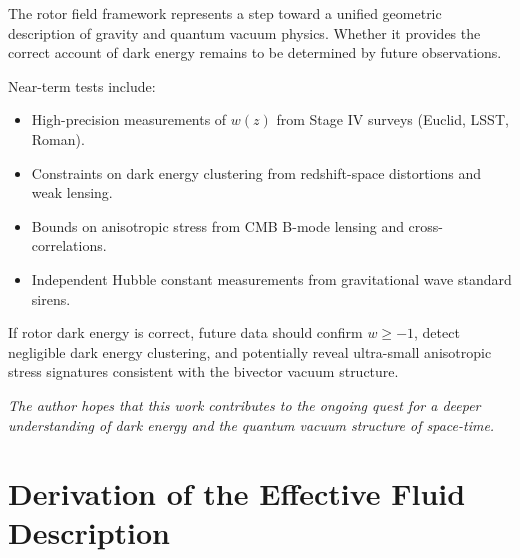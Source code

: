 \documentclass[11pt,a4paper]{article}
\numberwithin{equation}{section}
\theoremstyle{plain}
\theoremstyle{definition}
\theoremstyle{remark}
\newif\ifack
\begin{document}
The rotor field framework represents a step toward a unified geometric description of gravity and quantum vacuum physics. Whether it provides the correct account of dark energy remains to be determined by future observations.

Near-term tests include:
\begin{itemize}
  \item High-precision measurements of $w(z)$ from Stage IV surveys (Euclid, LSST, Roman).
  \item Constraints on dark energy clustering from redshift-space distortions and weak lensing.
  \item Bounds on anisotropic stress from CMB B-mode lensing and cross-correlations.
  \item Independent Hubble constant measurements from gravitational wave standard sirens.
\end{itemize}

If rotor dark energy is correct, future data should confirm $w \geq -1$, detect negligible dark energy clustering, and potentially reveal ultra-small anisotropic stress signatures consistent with the bivector vacuum structure.

\medskip
\noindent\textit{The author hopes that this work contributes to the ongoing quest for a deeper understanding of dark energy and the quantum vacuum structure of space-time.}

\ifack
\section*{Acknowledgements}
The author is indebted to the pioneering work of David Hestenes and colleagues in developing geometric algebra as a language for physics. Discussions with Anthony Lasenby and Chris Doran on gauge theory gravity and cosmological applications were invaluable. Thanks are due to the Planck, LIGO, and Supernova Cosmology Project teams for making data publicly available. This work was conducted independently without external funding.
\fi

\appendix

\section{Derivation of the Effective Fluid Description}
\label{app:fluid}
\end{document}

